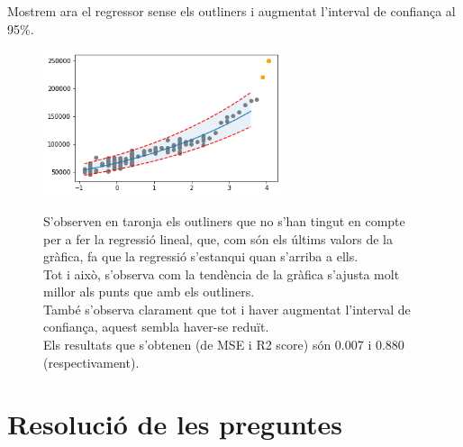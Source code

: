 \documentclass[a4paper, 11pt]{article}
\begin{document}
Mostrem ara el regressor sense els outliners i augmentat l'interval de confiança al 95\%.
\vspace{-1em}
\begin{figure}[h] %
\begin{minipage}{7cm} %
\begin{center}
    \includegraphics[width=7cm]{lasso/95posicion_sin_outliner_regression.png}
    \label{regresor_lineal_simple}
\end{center}
\end{minipage} %
\hspace{2em}
\begin{minipage}{7cm} %
\begin{justify}
S'observen en taronja els outliners que no s'han tingut en compte per a fer la regressió lineal, que, com són els últims valors de la gràfica, fa que la regressió s'estanqui quan s'arriba a ells.\\
Tot i això, s'observa com la tendència de la gràfica s'ajusta molt millor als punts que amb els outliners.
\\
També s'observa clarament que tot i haver augmentat l'interval de confiança, aquest sembla haver-se reduït.
\\
Els resultats que s'obtenen (de MSE i R2 score) són 0.007 i 0.880 (respectivament).

\end{justify}
\end{minipage} %
\end{figure} %
\newpage 


\section{Resolució de les preguntes}
\end{document}
